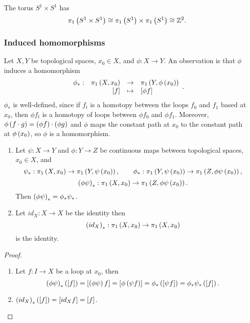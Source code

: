 \begin{example*}
The torus $ S^1 \times S^1 $ has
$$ \pi_1\left( S^1 \times S^1 \right) \cong \pi_1\left( S^1 \right) \times \pi_1\left( S^1 \right) \cong \mathbb{Z}^2. $$
\end{example*}

\pagebreak

\subsubsection{Induced homomorphisms}

Let $ X, Y $ be topological spaces, $ x_0 \in X $, and $ \phi : X \to Y $. An observation is that $ \phi $ induces a homomorphism
$$ \function[\phi_*]{\pi_1\rb{X, x_0}}{\pi_1\rb{Y, \phi\rb{x_0}}}{\sb{f}}{\sb{\phi f}}. $$
$ \phi_* $ is well-defined, since if $ f_t $ is a homotopy between the loops $ f_0 $ and $ f_1 $ based at $ x_0 $, then $ \phi f_t $ is a homotopy of loops between $ \phi f_0 $ and $ \phi f_1 $. Moreover, $ \phi\left( f \cdot g \right) = \left( \phi f \right) \cdot \left( \phi g \right) $ and $ \phi $ maps the constant path at $ x_0 $ to the constant path at $ \phi\left( x_0 \right) $, so $ \phi $ is a homomorphism.

\begin{proposition}
\hfill
\begin{enumerate}
\item Let $ \psi : X \to Y $ and $ \phi : Y \to Z $ be continuous maps between topological spaces, $ x_0 \in X $, and
$$ \psi_* : \pi_1\left( X, x_0 \right) \to \pi_1\left( Y, \psi\left( x_0 \right) \right), \qquad \phi_* : \pi_1\left( Y, \psi\left( x_0 \right) \right) \to \pi_1\left( Z, \phi\psi\left( x_0 \right) \right), $$
$$ \left( \phi\psi \right)_* : \pi_1\left( X, x_0 \right) \to \pi_1\left( Z, \phi\psi\left( x_0 \right) \right). $$
Then $ \left( \phi\psi \right)_* = \phi_*\psi_* $.
\item Let $ id_X : X \to X $ be the identity then
$$ \left( id_X \right)_* : \pi_1\left( X, x_0 \right) \to \pi_1\left( X, x_0 \right) $$
is the identity.
\end{enumerate}
\end{proposition}

\begin{proof}
\hfill
\begin{enumerate}
\item Let $ f : I \to X $ be a loop at $ x_0 $, then
$$ \left( \phi\psi \right)_*\left( \left[ f \right] \right) = \left[ \left( \phi\psi \right)f \right] = \left[ \phi\left( \psi f \right) \right] = \phi_*\left( \left[ \psi f \right] \right) = \phi_*\psi_*\left( \left[ f \right] \right). $$
\item $ \left( id_X \right)_*\left( \left[ f \right] \right) = \left[ id_Xf \right] = \left[ f \right] $.
\end{enumerate}
\end{proof}

